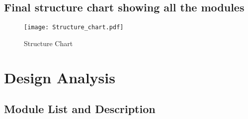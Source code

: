 \documentclass[12pt,a4paper]{article}
\begin{document}
\subsection{Final structure chart showing all the modules}
\begin{figure}
    \hspace{-3cm}
    \texttt{[image: Structure\_chart.pdf]}
    \caption{Structure Chart}
    \label{fig:enter-label}
\end{figure}
\newpage

\section{Design Analysis}

\subsection{Module List and Description}
\end{document}

